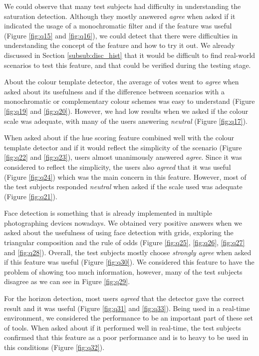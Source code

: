We could observe that many test subjects had difficulty in understanding the saturation detection. Although they mostly answered \emph{agree} when asked if it indicated the usage of a monochromatic filter and if the feature was useful (Figure \ref{fig:q15} and \ref{fig:q16}), we could detect that there were difficulties in understanding the concept of the feature and how to try it out. We already discussed in Section \ref{subsub:disc_hist} that it would be difficult to find real-world scenarios to test this feature, and that could be verified during the testing stage.

About the colour template detector, the average of votes went to \emph{agree} when asked about its usefulness and if the difference between scenarios with a monochromatic or complementary colour schemes was easy to understand (Figure \ref{fig:q19} and \ref{fig:q20}). However, we had low results when we asked if the colour scale was adequate, with many of the users answering \emph{neutral} (Figure \ref{fig:q17}).

When asked about if the hue scoring feature combined well with the colour template detector and if it would reflect the simplicity of the scenario (Figure \ref{fig:q22} and \ref{fig:q23}), users almost unanimously answered \emph{agree}. Since it was considered to reflect the simplicity, the users also \emph{agreed} that it was useful (Figure \ref{fig:q24}) which was the main concern in this feature. However, most of the test subjects responded \emph{neutral} when asked if the scale used was adequate (Figure \ref{fig:q21}).

Face detection is something that is already implemented in multiple photographing devices nowadays. We obtained very positive answers when we asked about the usefulness of using face detection with grids, exploring the triangular composition and the rule of odds (Figure \ref{fig:q25}, \ref{fig:q26}, \ref{fig:q27} and \ref{fig:q28}). Overall, the test subjects mostly choose \emph{strongly agree} when asked if this feature was useful (Figure \ref{fig:q30}). We considered this feature to have the problem of showing too much information, however, many of the test subjects disagree as we can see in Figure \ref{fig:q29}.

For the horizon detection, most users \emph{agreed} that the detector gave the correct result and it was useful (Figure \ref{fig:q31} and \ref{fig:q33}). Being used in a real-time environment, we considered the performance to be an important part of these set of tools. When asked about if it performed well in real-time, the test subjects confirmed that this feature as a poor performance and is to heavy to be used in this conditions (Figure \ref{fig:q32}).

